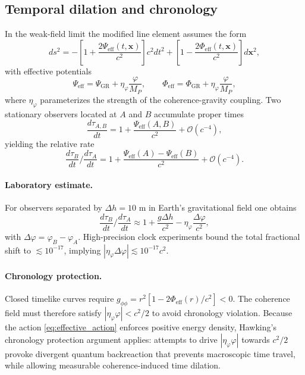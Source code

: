 \documentclass[12pt,a4paper]{article}
\theoremstyle{definition}
\begin{document}
\subsection{Temporal dilation and chronology}

In the weak-field limit the modified line element assumes the form\cite{Rindler2006}
\begin{equation}
ds^2 = -\left[1 + \frac{2 \Psi_{\text{eff}}(t,\mathbf{x})}{c^2}\right] c^2 dt^2 + \left[1 - \frac{2 \Phi_{\text{eff}}(t,\mathbf{x})}{c^2}\right] d\mathbf{x}^2,
\end{equation}
with effective potentials
\begin{equation}
\Psi_{\text{eff}} = \Psi_{\text{GR}} + \eta_\varphi \frac{\varphi}{M_P}, \qquad \Phi_{\text{eff}} = \Phi_{\text{GR}} + \eta_\varphi \frac{\varphi}{M_P},
\end{equation}
where $\eta_\varphi$ parameterizes the strength of the coherence-gravity coupling. Two stationary observers located at $A$ and $B$ accumulate proper times
\begin{equation}
\frac{d\tau_{A,B}}{dt} = 1 + \frac{\Psi_{\text{eff}}(A,B)}{c^2} + \mathcal{O}(c^{-4}),
\end{equation}
yielding the relative rate
\begin{equation}
\label{eq:time_dilation}
\frac{d\tau_B}{dt} \Big/ \frac{d\tau_A}{dt} = 1 + \frac{\Psi_{\text{eff}}(A) - \Psi_{\text{eff}}(B)}{c^2} + \mathcal{O}(c^{-4}).
\end{equation}

\paragraph{Laboratory estimate.} For observers separated by $\Delta h = 10$ m in Earth's gravitational field one obtains
\begin{equation}
\frac{d\tau_B}{dt} \Big/ \frac{d\tau_A}{dt} \approx 1 + \frac{g \Delta h}{c^2} - \eta_\varphi \frac{\Delta \varphi}{c^2},
\end{equation}
with $\Delta \varphi = \varphi_B - \varphi_A$. High-precision clock experiments bound the total fractional shift to $\lesssim 10^{-17}$\cite{Rosenband2008}, implying $|\eta_\varphi \Delta \varphi| \lesssim 10^{-17} c^2$.

\paragraph{Chronology protection.} Closed timelike curves require $g_{\phi\phi} = r^2 [1 - 2 \Phi_{\text{eff}}(r)/c^2] < 0$. The coherence field must therefore satisfy $|\eta_\varphi \varphi| < c^2/2$ to avoid chronology violation. Because the action \eqref{eq:effective_action} enforces positive energy density, Hawking's chronology protection argument\cite{Hawking1992} applies: attempts to drive $|\eta_\varphi \varphi|$ towards $c^2/2$ provoke divergent quantum backreaction that prevents macroscopic time travel, while allowing measurable coherence-induced time dilation.
\end{document}
